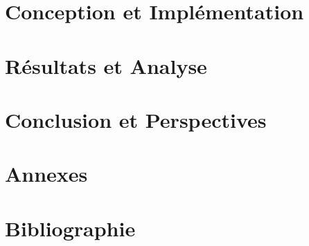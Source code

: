 \documentclass[a4paper,12pt]{report}
\begin{document}
\section{Conception et Implémentation}


\section{Résultats et Analyse}


\section{Conclusion et Perspectives}


\section{Annexes}

\section*{Bibliographie}


\end{document}
